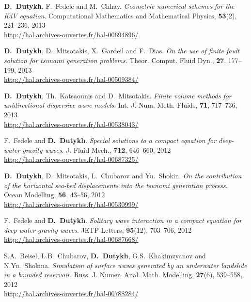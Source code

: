 \begin{etaremune}
  \item \textbf{D.~Dutykh}, F.~Fedele and M.~Chhay. \textit{Geometric numerical schemes for the KdV equation}. Computational Mathematics and Mathematical Physics, \textbf{53}(2), 221--236, 2013 \\ %
  \url{http://hal.archives-ouvertes.fr/hal-00694896/}
  
  \item \textbf{D.~Dutykh}, D.~Mitsotakis, X.~Gardeil and F.~Dias. \textit{On the use of finite fault solution for tsunami generation problems}. Theor. Comput. Fluid Dyn., \textbf{27}, 177--199, 2013 \\ %
  \url{http://hal.archives-ouvertes.fr/hal-00509384/}

  \item \textbf{D.~Dutykh}, Th.~Katsaounis and D.~Mitsotakis. \textit{Finite volume methods for unidirectional dispersive wave models}. Int. J. Num. Meth. Fluids, \textbf{71}, 717--736, 2013 \\ %
  \url{http://hal.archives-ouvertes.fr/hal-00538043/}
  

  \item F.~Fedele and \textbf{D.~Dutykh}. \textit{Special solutions to a compact equation for deep-water gravity waves}. J. Fluid Mech., \textbf{712}, 646--660, 2012 \\ %
  \url{http://hal.archives-ouvertes.fr/hal-00687325/}

  \item \textbf{D.~Dutykh}, D.~Mitsotakis, L.~Chubarov and Yu.~Shokin. \textit{On the contribution of the horizontal sea-bed displacements into the tsunami generation process}. Ocean Modelling, \textbf{56}, 43--56, 2012 \\ %
  \url{http://hal.archives-ouvertes.fr/hal-00530999/}
  
 \item F.~Fedele and \textbf{D.~Dutykh}. \textit{Solitary wave interaction in a compact equation for deep-water gravity waves}. JETP Letters, \textbf{95}(12), 703--706, 2012 \\ %
  \url{http://hal.archives-ouvertes.fr/hal-00687668/}

  \item S.A.~Beisel, L.B.~Chubarov, \textbf{D.~Dutykh}, G.S.~Khakimzyanov and N.Yu.~Shokina. \textit{Simulation of surface waves generated by an underwater landslide in a bounded reservoir}. Russ. J. Numer. Anal. Math. Modelling, \textbf{27}(6), 539--558, 2012 \\ %
  \url{http://hal.archives-ouvertes.fr/hal-00788284/}


\end{etaremune}

